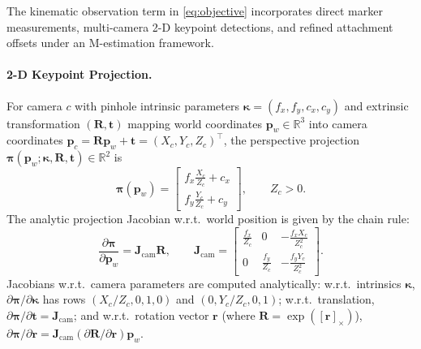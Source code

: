 \documentclass[11pt,a4paper]{article}
\newcommand{\R}{\mathbb{R}}
\begin{document}
The kinematic observation term in \eqref{eq:objective} incorporates direct marker
measurements, multi-camera 2-D keypoint detections, and refined attachment offsets
under an M-estimation framework.

\paragraph{2-D Keypoint Projection.}
For camera $c$ with pinhole intrinsic parameters $\boldsymbol{\kappa}=(f_x, f_y, c_x, c_y)$
and extrinsic transformation $(\mathbf{R}, \mathbf{t})$ mapping world coordinates
$\mathbf{p}_w \in \R^3$ into camera coordinates $\mathbf{p}_c = \mathbf{R}\mathbf{p}_w + \mathbf{t} = (X_c, Y_c, Z_c)^\top$,
the perspective projection $\boldsymbol{\pi}(\mathbf{p}_w; \boldsymbol{\kappa}, \mathbf{R}, \mathbf{t}) \in \R^2$ is
\begin{equation}
  \boldsymbol{\pi}(\mathbf{p}_w) = \begin{bmatrix} f_x \frac{X_c}{Z_c} + c_x \\ f_y \frac{Y_c}{Z_c} + c_y \end{bmatrix}, \qquad Z_c > 0.
\end{equation}
The analytic projection Jacobian w.r.t.\ world position is given by the chain rule:
\begin{equation}
  \frac{\partial \boldsymbol{\pi}}{\partial \mathbf{p}_w} = \mathbf{J}_{\mathrm{cam}} \mathbf{R}, \qquad
  \mathbf{J}_{\mathrm{cam}} = \begin{bmatrix} \frac{f_x}{Z_c} & 0 & -\frac{f_x X_c}{Z_c^2} \\ 0 & \frac{f_y}{Z_c} & -\frac{f_y Y_c}{Z_c^2} \end{bmatrix} .
\end{equation}
Jacobians w.r.t.\ camera parameters are computed analytically: w.r.t.\ intrinsics $\boldsymbol{\kappa}$,
$\partial \boldsymbol{\pi}/\partial \boldsymbol{\kappa}$ has rows $(X_c/Z_c, 0, 1, 0)$ and $(0, Y_c/Z_c, 0, 1)$;
w.r.t.\ translation, $\partial \boldsymbol{\pi}/\partial \mathbf{t} = \mathbf{J}_{\mathrm{cam}}$;
and w.r.t.\ rotation vector $\mathbf{r}$ (where $\mathbf{R} = \exp([\mathbf{r}]_\times)$),
$\partial \boldsymbol{\pi}/\partial \mathbf{r} = \mathbf{J}_{\mathrm{cam}} (\partial \mathbf{R}/\partial \mathbf{r}) \mathbf{p}_w$.
\end{document}
